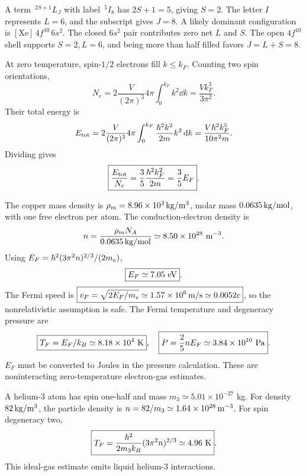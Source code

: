 A term $\,{}^{2S+1}L_J$ with label
$\,{}^{5}I_8$ has
$2S+1=5$, giving $\boxed{S=2}$.
The letter $I$ represents
$\boxed{L=6}$, and the subscript
gives $\boxed{J=8}$.
A likely dominant configuration is
$\boxed{[\mathrm{Xe}]\,4f^{10}\,6s^2}$.
The closed $6s^2$ pair contributes
zero net $L$ and $S$.
The open $4f^{10}$ shell supports
$S=2,L=6$, and being more than half
filled favors $J=L+S=8$.

At zero temperature, spin-$1/2$
electrons fill $k\le k_F$. Counting
two spin orientations,
\begin{equation}
N_e=2\frac{V}{(2\pi)^3}4\pi
\int_0^{k_F}k^2\dd k
=\frac{Vk_F^3}{3\pi^2}.
\end{equation}
Their total energy is
\begin{equation}
E_{\rm tot}=2\frac{V}{(2\pi)^3}4\pi
\int_0^{k_F}
\frac{\hbar^2k^2}{2m}k^2\,\mathrm d k
=\frac{V\hbar^2k_F^5}{10\pi^2m}.
\end{equation}
Dividing gives
\begin{equation}
\boxed{\frac{E_{\rm tot}}{N_e}
=\frac35\frac{\hbar^2k_F^2}{2m}
=\frac35E_F}.
\end{equation}

The copper mass density is
$\rho_m=8.96\times10^3\,{\rm kg/m^3}$,
molar mass $0.0635\,{\rm kg/mol}$,
with one free electron per atom.
The conduction-electron density is
\begin{equation}
n=\frac{\rho_m N_A}{0.0635\,{\rm kg/mol}}
\simeq8.50\times10^{28}\ {\rm m}^{-3}.
\end{equation}
Using
$E_F=\hbar^2(3\pi^2n)^{2/3}/(2m_e)$,
\begin{equation}
\boxed{E_F\simeq7.05\ {\rm eV}}.
\end{equation}
The Fermi speed is
$\boxed{v_F=\sqrt{2E_F/m_e}\simeq
1.57\times10^6\,{\rm m/s}\simeq0.0052c}$,
so the nonrelativistic assumption is safe.
The Fermi temperature and degeneracy pressure are
\begin{equation}
\boxed{T_F=E_F/k_B\simeq8.18\times10^4\ {\rm K}},
\quad
\boxed{P=\frac25nE_F\simeq3.84\times10^{10}\ {\rm Pa}}.
\end{equation}
$E_F$ must be converted to Joules
in the pressure calculation.
These are noninteracting zero-temperature
electron-gas estimates.

A helium-3 atom has spin one-half
and mass $m_3\simeq5.01\times10^{-27}$ kg.
For density $82\,{\rm kg/m^3}$,
the particle density is
$n=82/m_3\simeq1.64\times10^{28}\,{\rm m^{-3}}$.
For spin degeneracy two,
\begin{equation}
\boxed{T_F=
\frac{\hbar^2}{2m_3k_B}(3\pi^2n)^{2/3}
\simeq4.96\ {\rm K}}.
\end{equation}
This ideal-gas estimate omits
liquid helium-3 interactions.

